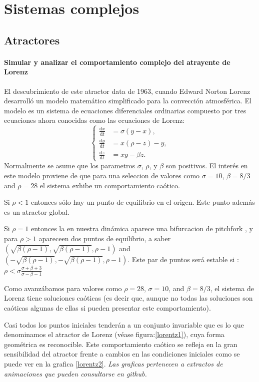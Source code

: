 \chapter{Sistemas complejos}
\section{Atractores}
\subsubsection{\large Simular y analizar el comportamiento complejo del atrayente de Lorenz} 
El descubrimiento de este atractor data de 1963, cuando Edward Norton Lorenz desarrolló un modelo matemático simplificado para la convección atmosférica. El modelo es un sistema de ecuaciones diferenciales ordinarias compuesto por tres ecuaciones ahora conocidas como las ecuaciones de Lorenz:
$$\left\{\begin{matrix}\frac{\mathrm{d}x}{\mathrm{d}t} &= \sigma (y - x), \\
	\frac{\mathrm{d}y}{\mathrm{d}t} &= x (\rho - z) - y, \\
	\frac{\mathrm{d}z}{\mathrm{d}t} &= x y - \beta z.\end{matrix}\right.$$
Normalmente se asume que los parametros $\sigma$, $\rho$, y $\beta$ son positivos. El interés en este modelo proviene de que para una seleccion de valores como $\sigma = 10$, $\beta = 8/3$ and $\rho = 28 $ el sistema exhibe un comportamiento caótico.

Si $\rho < 1$ entonces sólo hay un punto de equilibrio en el origen. Este punto además es un atractor global.

Si $\rho = 1$ entonces la en nuestra dinámica aparece una bifurcacion de pitchfork , y para  $\rho > 1 $ apareceen dos puntos de equilibrio, a saber $\left( \sqrt{\beta(\rho-1)}, \sqrt{\beta(\rho-1)}, \rho-1 \right) $ and $\left( -\sqrt{\beta(\rho-1)}, -\sqrt{\beta(\rho-1)}, \rho-1 \right). $ 
Este par de puntos será estable si : $\rho < \sigma\frac{\sigma+\beta+3}{\sigma-\beta-1}$

Como avanzábamos para valores como $\rho = 28$, $\sigma = 10$, and $\beta = 8/3$, el sistema de Lorenz tiene soluciones caóticas (es decir que, aunque no todas las soluciones son caóticas algunas de ellas si pueden presentar este comportamiento).

 Casi todos los puntos iniciales tenderán a un conjunto invariable que es lo que denominamos el atractor de Lorenz (véase figura:\ref{lorentz1}), cuya forma geométrica es reconocible. Este comportamiento caótico se refleja en la gran sensibilidad del atractor frente a cambios en las condiciones iniciales como se puede ver en la grafica \ref{lorentz2}.\textit{ Las graficas pertenecen a extractos de animaciones que pueden consultarse en github.}
 
